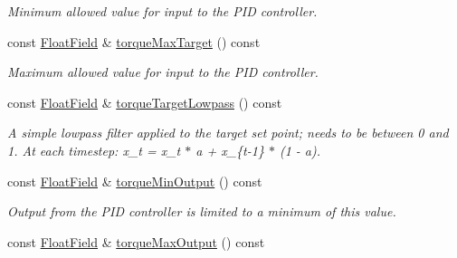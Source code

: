 \begin{DoxyCompactItemize}
\begin{DoxyCompactList}\small\item\em Minimum allowed value for input to the P\+ID controller. \end{DoxyCompactList}\item 
const \hyperlink{classhebi_1_1Info_1_1FloatField}{Float\+Field} \& \hyperlink{classhebi_1_1Info_1_1Settings_1_1Actuator_1_1TorqueGains_acd6396cbd3f392d5fdde00f2de5c0d34}{torque\+Max\+Target} () const \hypertarget{classhebi_1_1Info_1_1Settings_1_1Actuator_1_1TorqueGains_acd6396cbd3f392d5fdde00f2de5c0d34}{}\label{classhebi_1_1Info_1_1Settings_1_1Actuator_1_1TorqueGains_acd6396cbd3f392d5fdde00f2de5c0d34}

\begin{DoxyCompactList}\small\item\em Maximum allowed value for input to the P\+ID controller. \end{DoxyCompactList}\item 
const \hyperlink{classhebi_1_1Info_1_1FloatField}{Float\+Field} \& \hyperlink{classhebi_1_1Info_1_1Settings_1_1Actuator_1_1TorqueGains_a9e8e121d824bd76280bad12affe62790}{torque\+Target\+Lowpass} () const \hypertarget{classhebi_1_1Info_1_1Settings_1_1Actuator_1_1TorqueGains_a9e8e121d824bd76280bad12affe62790}{}\label{classhebi_1_1Info_1_1Settings_1_1Actuator_1_1TorqueGains_a9e8e121d824bd76280bad12affe62790}

\begin{DoxyCompactList}\small\item\em A simple lowpass filter applied to the target set point; needs to be between 0 and 1. At each timestep\+: x\+\_\+t = x\+\_\+t $\ast$ a + x\+\_\+\{t-\/1\} $\ast$ (1 -\/ a). \end{DoxyCompactList}\item 
const \hyperlink{classhebi_1_1Info_1_1FloatField}{Float\+Field} \& \hyperlink{classhebi_1_1Info_1_1Settings_1_1Actuator_1_1TorqueGains_ace8cc45399ca1a56cd721816feee109b}{torque\+Min\+Output} () const \hypertarget{classhebi_1_1Info_1_1Settings_1_1Actuator_1_1TorqueGains_ace8cc45399ca1a56cd721816feee109b}{}\label{classhebi_1_1Info_1_1Settings_1_1Actuator_1_1TorqueGains_ace8cc45399ca1a56cd721816feee109b}

\begin{DoxyCompactList}\small\item\em Output from the P\+ID controller is limited to a minimum of this value. \end{DoxyCompactList}\item 
const \hyperlink{classhebi_1_1Info_1_1FloatField}{Float\+Field} \& \hyperlink{classhebi_1_1Info_1_1Settings_1_1Actuator_1_1TorqueGains_ab2decfb4905670824ecb423e1fcd89ea}{torque\+Max\+Output} () const \hypertarget{classhebi_1_1Info_1_1Settings_1_1Actuator_1_1TorqueGains_ab2decfb4905670824ecb423e1fcd89ea}{}\label{classhebi_1_1Info_1_1Settings_1_1Actuator_1_1TorqueGains_ab2decfb4905670824ecb423e1fcd89ea}


\end{DoxyCompactItemize}
